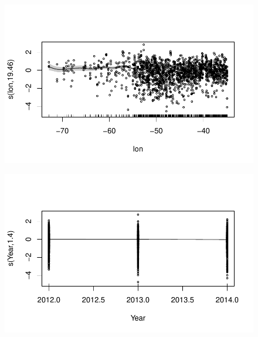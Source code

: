 \documentclass[
  letterpaper,
  DIV=11,
  numbers=noendperiod]{scrartcl}
\begin{document}
\begin{figure}[H]

{\centering \includegraphics{Group34Coursework_files/figure-pdf/unnamed-chunk-16-10.pdf}

}

\end{figure}

\begin{figure}[H]

{\centering \includegraphics{Group34Coursework_files/figure-pdf/unnamed-chunk-16-11.pdf}

}

\end{figure}
\end{document}
